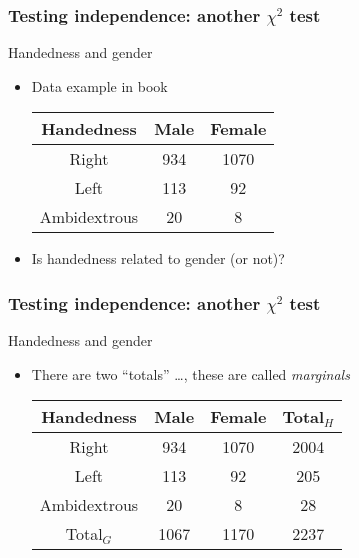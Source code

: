 \documentclass[handout]{beamer}
\begin{document}

   \begin{frame} \frametitle{Testing independence:  another $\chi^2$ test}

   \begin{block}
     {Handedness and gender}
     \begin{itemize}
     \item Data example in book

       \begin{center}
     \begin{tabular}{c|c|c}
       Handedness & Male & Female \\ \hline
       Right & 934 & 1070 \\
       Left & 113 & 92 \\
       Ambidextrous & 20 & 8
     \end{tabular}
       \end{center}
       \item Is handedness related to gender (or not)?
     \end{itemize}
   \end{block}
   \end{frame}


   \begin{frame} \frametitle{Testing independence: another $\chi^2$ test}

   \begin{block}
     {Handedness and gender}
     \begin{itemize}
     \item There are two ``totals'' \dots, these are called {\em marginals}
     \begin{tabular}{c|c|c|c}
       Handedness & Male & Female & Total$_H$ \\ \hline
       Right & 934 & 1070 & 2004 \\
       Left & 113 & 92 & 205 \\
       Ambidextrous & 20 & 8 & 28 \\ \hline
       Total$_G$ & 1067 & 1170 & 2237
     \end{tabular}
     \end{itemize}
   \end{block}
   \end{frame}

\end{document}
